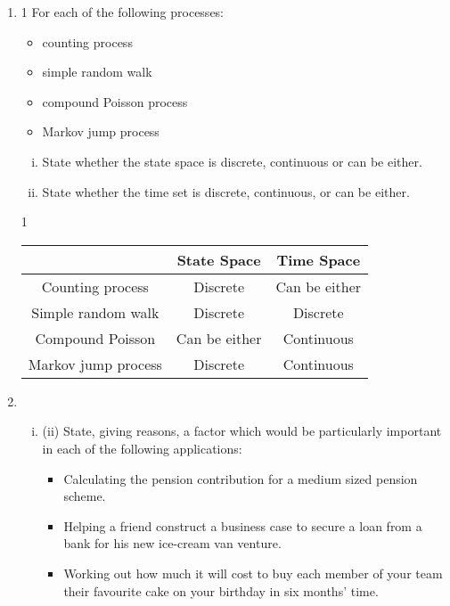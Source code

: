 \documentclass[a4paper,12pt]{article}
\begin{document}
\begin{enumerate}
\item 
1 For each of the following processes:
\begin{itemize}
\item  counting process
\item simple random walk
\item compound Poisson process
\item  Markov jump process
\end{itemize}
\begin{enumerate}[(i)]
\item State whether the state space is discrete, continuous or can be either. 
\item State whether the time set is discrete, continuous, or can be either. 
\end{enumerate}
1 
\begin{center}
\begin{tabular}{|c|c|c|}

& State Space  & Time Space \\ \hline
Counting process & Discrete &  Can be either\\ \hline
Simple random walk & Discrete & Discrete\\ \hline
Compound Poisson & Can be either & Continuous\\ \hline
Markov jump process  & Discrete &  Continuous \\ \hline
\end{tabular}
\end{center}
\newpage
\item 
\begin{enumerate}[(i)](i) List eight factors which should be considered when assessing whether a model is suitable for a particular application. 
\item (ii) State, giving reasons, a factor which would be particularly important in each of the following applications:
\begin{itemize}
    \item  Calculating the pension contribution for a medium sized pension scheme.
\item Helping a friend construct a business case to secure a loan from a bank for his new ice-cream van venture.
\item Working out how much it will cost to buy each member of your team their favourite cake on your birthday in six months’ time.
\end{itemize}
\end{enumerate}

\end{enumerate}
\end{document}
